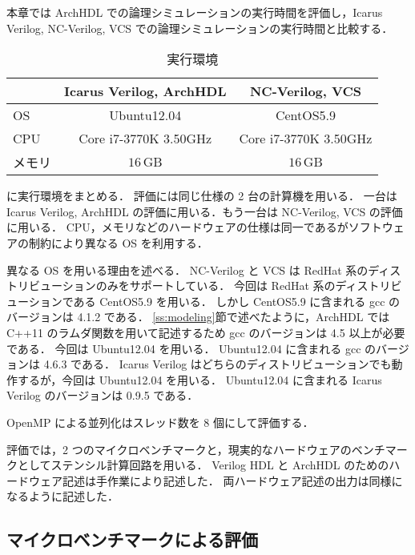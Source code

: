 本章では ArchHDL での論理シミュレーションの実行時間を評価し，Icarus Verilog, NC-Verilog, VCS での論理シミュレーションの実行時間と比較する．

\begin{table}[t]
 \caption{実行環境}
 \label{table:exec_env}
 \begin{center}
  \begin{tabular}{l|c|c} \hline
         &  Icarus Verilog, ArchHDL  &  NC-Verilog, VCS   \\ \hline
  OS     &  Ubuntu12.04             &  CentOS5.9        \\
  CPU    &  Core i7-3770K 3.50GHz   &  Core i7-3770K 3.50GHz  \\
  メモリ  &  $16\,\mathrm{GB}$       &  $16\,\mathrm{GB}$  \\ \hline
  \end{tabular}
 \end{center}
\end{table}

 に実行環境をまとめる．
評価には同じ仕様の 2 台の計算機を用いる．
一台は Icarus Verilog, ArchHDL の評価に用いる．もう一台は NC-Verilog, VCS の評価に用いる．
CPU，メモリなどのハードウェアの仕様は同一であるがソフトウェアの制約により異なる OS を利用する．

異なる OS を用いる理由を述べる．
NC-Verilog と VCS は RedHat 系のディストリビューションのみをサポートしている．
今回は RedHat 系のディストリビューションである CentOS5.9 を用いる．
しかし CentOS5.9 に含まれる gcc のバージョンは 4.1.2 である．
\ref{ss:modeling}節で述べたように，ArchHDL では C++11 のラムダ関数を用いて記述するため gcc のバージョンは 4.5 以上が必要である．
今回は Ubuntu12.04 を用いる．
Ubuntu12.04 に含まれる gcc のバージョンは 4.6.3 である．
Icarus Verilog はどちらのディストリビューションでも動作するが，今回は Ubuntu12.04 を用いる．
Ubuntu12.04 に含まれる Icarus Verilog のバージョンは 0.9.5 である．

OpenMP による並列化はスレッド数を 8 個にして評価する．

評価では，2 つのマイクロベンチマークと，現実的なハードウェアのベンチマークとしてステンシル計算回路\cite{koba:stencil}を用いる．
Verilog HDL と ArchHDL のためのハードウェア記述は手作業により記述した．
両ハードウェア記述の出力は同様になるように記述した．


\subsection{マイクロベンチマークによる評価}

